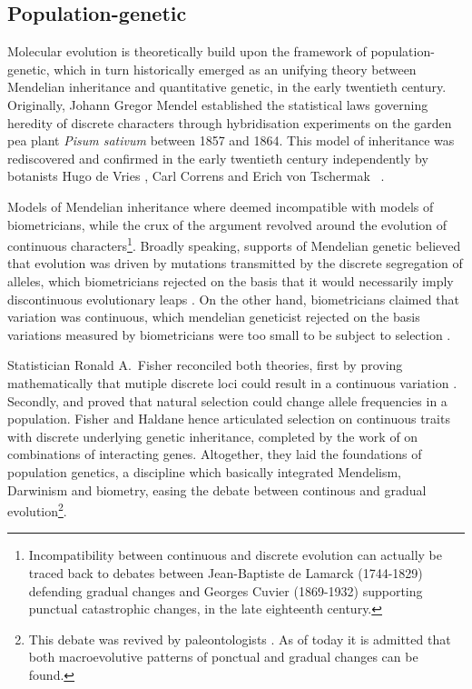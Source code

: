 \subsection{Population-genetic}
Molecular evolution is theoretically build upon the framework of population-genetic, which in turn historically emerged as an unifying theory between Mendelian inheritance and quantitative genetic, in the early twentieth century.
Originally,
Johann Gregor Mendel%
 established the statistical laws governing heredity of discrete characters through  hybridisation experiments on the garden pea plant \textit{Pisum sativum} between 1857 and 1864.
This model of inheritance was rediscovered and confirmed in the early twentieth century independently by botanists
Hugo de Vries%
, Carl Correns%
 and Erich von Tschermak%
\ \citep{dunn2003gregor}.

Models of Mendelian inheritance where deemed incompatible with models of biometricians, while the crux of the argument revolved around the evolution of continuous characters\footnote{Incompatibility between continuous and discrete evolution can actually be traced back to debates between Jean-Baptiste de Lamarck (1744-1829) defending gradual changes and Georges Cuvier (1869-1932) supporting punctual catastrophic changes, in the late eighteenth century.}.
Broadly speaking, supports of Mendelian genetic believed that evolution was driven by mutations transmitted by the discrete segregation of alleles, which biometricians rejected on the basis that it would necessarily imply discontinuous evolutionary leaps \citep{bowler2003evolution}.
On the other hand, biometricians claimed that variation was continuous, which mendelian geneticist rejected on the basis variations measured by biometricians were too small to be subject to selection \citep{provine2001origins}.

Statistician Ronald A.\ Fisher reconciled both theories, first by proving mathematically that mutiple discrete loci could result in a continuous variation \citep{fisher1919xv}.
Secondly, \citet{fisher1930genetical} and \citet{haldane1932causes} proved that natural selection could change \gls{allele} frequencies in a population. 
Fisher and Haldane hence articulated selection on continuous traits with discrete underlying genetic inheritance, completed by the work of \citet{wright1932roles} on combinations of interacting genes.
Altogether, they laid the foundations of population genetics, a discipline which basically integrated Mendelism, Darwinism and biometry, easing the debate between continous and gradual evolution\footnote{This debate was revived by paleontologists \citet*{Gould1972}. As of today it is admitted that both macroevolutive patterns of ponctual and gradual changes can be found.}.


